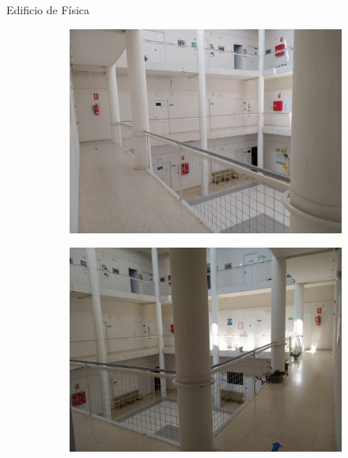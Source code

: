 \documentclass{beamer}
\begin{document}
  \begin{frame}{Edificio de Física}
    \begin{figure}[h]
      \begin{subfigure}[b]{.45\textwidth}
        \centering
        \includegraphics[width=\textwidth]{pic/fisica1.jpg}
        \label{fig:foto_fisica1}
      \end{subfigure}
      \begin{subfigure}[b]{.45\textwidth}
        \centering
        \includegraphics[width=\textwidth]{pic/fisica2.jpg}
        \label{fig:foto_fisica2}
      \end{subfigure}
      \label{fig:foto_fisica}
    \end{figure}
  \end{frame}
\end{document}
